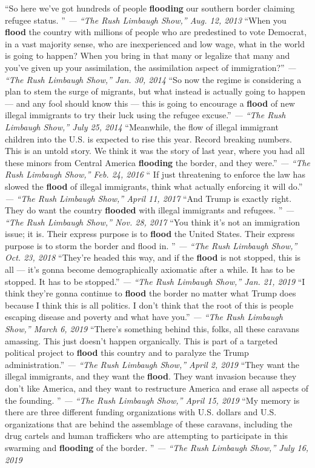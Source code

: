  ``So here we've got hundreds of people \textbf{flooding} our southern
border claiming refugee status. '' \emph{--- ``The Rush Limbaugh Show,''
Aug. 12, 2013} ``When you \textbf{flood} the country with millions of
people who are predestined to vote Democrat, in a vast majority sense,
who are inexperienced and low wage, what in the world is going to
happen? When you bring in that many or legalize that many and you've
given up your assimilation, the assimilation aspect of immigration?''
\emph{--- ``The Rush Limbaugh Show,'' Jan. 30, 2014} ``So now the regime
is considering a plan to stem the surge of migrants, but what instead is
actually going to happen --- and any fool should know this --- this is
going to encourage a \textbf{flood} of new illegal immigrants to try
their luck using the refugee excuse.'' \emph{--- ``The Rush Limbaugh
Show,'' July 25, 2014} ``Meanwhile, the flow of illegal immigrant
children into the U.S. is expected to rise this year. Record breaking
numbers. This is an untold story. We think it was the story of last
year, where you had all these minors from Central America
\textbf{flooding} the border, and they were.'' \emph{--- ``The Rush
Limbaugh Show,'' Feb. 24, 2016} `` If just threatening to enforce the
law has slowed the \textbf{flood} of illegal immigrants, think what
actually enforcing it will do.'' \emph{--- ``The Rush Limbaugh Show,''
April 11, 2017} ``And Trump is exactly right. They do want the country
\textbf{flooded} with illegal immigrants and refugees. '' \emph{---
``The Rush Limbaugh Show,'' Nov. 28, 2017} ``You think it's not an
immigration issue; it is. Their express purpose is to \textbf{flood} the
United States. Their express purpose is to storm the border and flood
in. '' \emph{--- ``The Rush Limbaugh Show,'' Oct. 23, 2018} ``They're
headed this way, and if the \textbf{flood} is not stopped, this is all
--- it's gonna become demographically axiomatic after a while. It has to
be stopped. It has to be stopped.'' \emph{--- ``The Rush Limbaugh
Show,'' Jan. 21, 2019} ``I think they're gonna continue to
\textbf{flood} the border no matter what Trump does because I think this
is all politics. I don't think that the root of this is people escaping
disease and poverty and what have you.'' \emph{--- ``The Rush Limbaugh
Show,'' March 6, 2019} ``There's something behind this, folks, all these
caravans amassing. This just doesn't happen organically. This is part of
a targeted political project to \textbf{flood} this country and to
paralyze the Trump administration.'' \emph{--- ``The Rush Limbaugh
Show,'' April 2, 2019} ``They want the illegal immigrants, and they want
the \textbf{flood}. They want invasion because they don't like America,
and they want to restructure America and erase all aspects of the
founding. '' \emph{--- ``The Rush Limbaugh Show,'' April 15, 2019} ``My
memory is there are three different funding organizations with U.S.
dollars and U.S. organizations that are behind the assemblage of these
caravans, including the drug cartels and human traffickers who are
attempting to participate in this swarming and \textbf{flooding} of the
border. '' \emph{--- ``The Rush Limbaugh Show,'' July 16, 2019}

